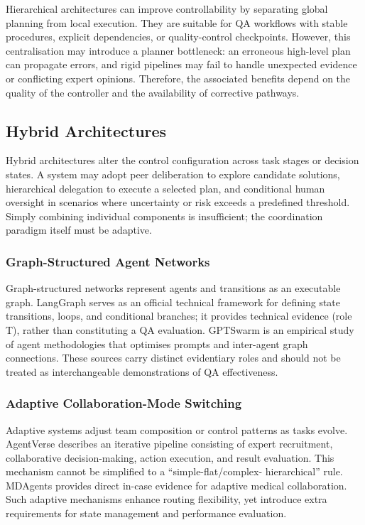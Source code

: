 Hierarchical architectures can improve controllability by separating global planning from local execution. They are suitable for QA workflows with stable procedures, explicit dependencies, or quality-control checkpoints. However, this centralisation may introduce a planner bottleneck: an erroneous high-level plan can propagate errors, and rigid pipelines may fail to handle unexpected evidence or conflicting expert opinions. Therefore, the associated benefits depend on the quality of the controller and the availability of corrective pathways.

\subsection{Hybrid Architectures}
\label{sec:hybrid}

Hybrid architectures alter the control configuration across task stages or decision states. A system may adopt peer deliberation to explore candidate solutions, hierarchical delegation to execute a selected plan, and conditional human oversight in scenarios where uncertainty or risk exceeds a predefined threshold. Simply combining individual components is insufficient; the coordination paradigm itself must be adaptive.

\subsubsection{Graph-Structured Agent Networks}
\label{sec:graph}

Graph-structured networks represent agents and transitions as an executable graph. LangGraph \citep{langgraph2024} serves as an official technical framework for defining state transitions, loops, and conditional branches; it provides technical evidence (role T), rather than constituting a QA evaluation. GPTSwarm \citep{zhuge2024gptswarm} is an empirical study of agent methodologies that optimises prompts and inter-agent graph connections. These sources carry distinct evidentiary roles and should not be treated as interchangeable demonstrations of QA effectiveness.

\subsubsection{Adaptive Collaboration-Mode Switching}
\label{sec:adaptive}

Adaptive systems adjust team composition or control patterns as tasks evolve.
AgentVerse \citep{chen2024agentverse} describes an iterative pipeline consisting of
expert recruitment, collaborative decision-making, action execution, and
result evaluation. This mechanism cannot be simplified to a ``simple-flat/complex-
hierarchical'' rule. MDAgents \citep{kim2024mdagents} provides direct
in-case evidence for adaptive medical collaboration. Such adaptive mechanisms
enhance routing flexibility, yet introduce extra requirements for state management
and performance evaluation.

